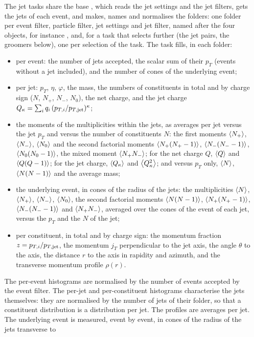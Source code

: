 The jet tasks share the base , which reads the jet settings and the jet filters, gets the jets of each
event, and makes, names and normalises the folders: one folder per event filter, particle filter, jet settings and jet
filter, named after the four objects, for instance , and, for a task that
selects further (the jet pairs, the groomers below), one per selection of the task. The task  fills,
in each folder:
\begin{itemize}
  \item per event: the number of jets accepted, the scalar sum of their $p_T$ (events without a jet included), and the
  number of cones of the underlying event;
  \item per jet: $p_T$, $\eta$, $\varphi$, the mass, the numbers of constituents in total and by charge sign
  ($N$, $N_+$, $N_-$, $N_0$), the net charge, and the jet charge $Q_\kappa = \sum_i q_i\,(p_{T,i}/p_{T,{\rm jet}})^\kappa$;
  \item the moments of the multiplicities within the jets, as averages per jet versus the jet $p_T$ and versus the number
  of constituents $N$: the first moments $\left\langle N_+ \right\rangle$, $\left\langle N_- \right\rangle$, $\left\langle N_0 \right\rangle$ and the second factorial moments
  $\left\langle N_+(N_+-1) \right\rangle$, $\left\langle N_-(N_--1) \right\rangle$, $\left\langle N_0(N_0-1) \right\rangle$, the mixed moment $\left\langle N_+N_- \right\rangle$; for the net charge $Q$, $\left\langle Q \right\rangle$ and
  $\left\langle Q(Q-1) \right\rangle$; for the jet charge, $\left\langle Q_\kappa \right\rangle$ and $\left\langle Q_\kappa^2 \right\rangle$; and versus $p_T$ only, $\left\langle N \right\rangle$,
  $\left\langle N(N-1) \right\rangle$ and the average mass;
  \item the underlying event, in cones of the radius of the jets: the multiplicities $\left\langle N \right\rangle$, $\left\langle N_+ \right\rangle$,
  $\left\langle N_- \right\rangle$, $\left\langle N_0 \right\rangle$, the second factorial moments $\left\langle N(N-1) \right\rangle$, $\left\langle N_+(N_+-1) \right\rangle$, $\left\langle N_-(N_--1) \right\rangle$
  and $\left\langle N_+N_- \right\rangle$,
  averaged over the cones of the event of each jet, versus the $p_T$ and the $N$ of the jet;
  \item per constituent, in total and by charge sign: the momentum fraction $z = p_{T,i}/p_{T,{\rm jet}}$, the
  momentum $j_T$ perpendicular to the jet axis, the angle $\theta$ to the axis, the distance $r$ to the axis in rapidity
  and azimuth, and the transverse momentum profile $\rho(r)$.
\end{itemize}
The per-event histograms are normalised by the number of events accepted by the event filter. The per-jet and
per-constituent histograms characterise the jets themselves: they are normalised by the number of jets of their folder,
so that a constituent distribution is a distribution per jet. The profiles are averages per jet. The underlying event is measured, event by event, in cones of the radius of the jets transverse to
